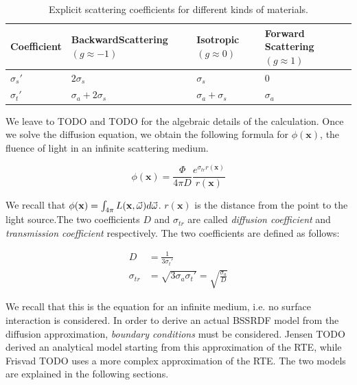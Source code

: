 \renewcommand{\arraystretch}{1.8}
\begin{table}[!ht]
    \centering
    \begin{tabularx}{0.95\textwidth}{|X|X|X|X|}
    \hline
    Coefficient   & Backward\linebreak Scattering \linebreak $(g \approx -1)$ & Isotropic \linebreak\linebreak $(g \approx 0)$ & Forward \linebreak Scattering \linebreak $(g \approx 1)$ \\ \hline
    $\sigma_s'$   & $2 \sigma_s$ & $\sigma_s$ & 0   \\ \hline
    $\sigma_t'$   & $\sigma_a + 2 \sigma_s$ & $\sigma_a + \sigma_s$ &  $\sigma_a$  \\ \hline
    \end{tabularx}
\caption{Explicit scattering coefficients for different kinds of materials.}
\label{table:coefficients}
\end{table}

We leave to TODO and TODO for the algebraic details of the calculation. Once we solve the diffusion equation, we obtain the following formula for $\phi(\mathbf{x})$, the fluence of light in an infinite scattering medium.

$$
\phi(\mathbf{x}) = \frac{\Phi}{4\pi D} \frac{e^{\sigma_{tr} r(\mathbf{x})}}{r(\mathbf{x})}
$$

We recall that $\phi(\mathbf{x}) = \int_{4\pi}L(\mathbf{x},\vec{\omega}) d\vec{\omega}$. $r(\mathbf{x})$ is the distance from the point to the light source.The two coefficients $D$ and $\sigma_{tr}$ are called \emph{diffusion coefficient} and \emph{transmission coefficient} respectively. The two coefficients are defined as follows:

\begin{equation*}
\begin{split}
D &= \frac{1}{3 \sigma_t'} \\
\sigma_{tr} &= \sqrt{3 \sigma_a \sigma_t'} = \sqrt{\frac{\sigma_a}{D}}
\end{split}
\end{equation*}

We recall that this is the equation for an infinite medium, i.e. no surface interaction is considered. In order to derive an actual BSSRDF model from the diffusion approximation, \emph{boundary conditions} must be considered. Jensen TODO derived an analytical model starting from this approximation of the RTE, while Frisvad TODO uses a more complex approximation of the RTE. The two models are explained in the following sections.


